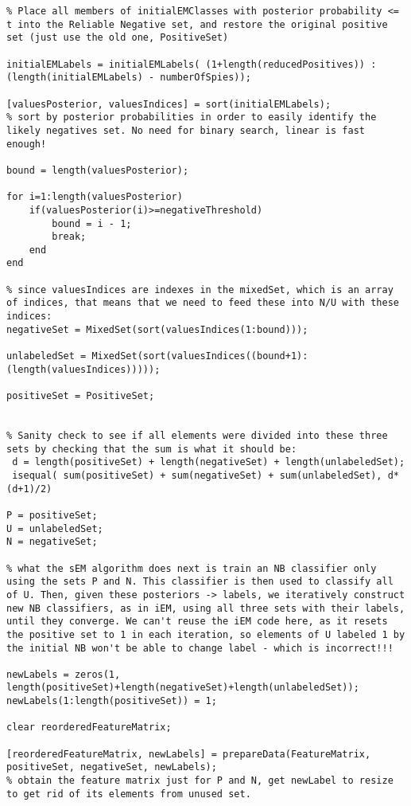 \documentclass[12pt,twoside,notitlepage,amsart]{report} %
\begin{document}
\begin{lstlisting}
% Place all members of initialEMClasses with posterior probability <= t into the Reliable Negative set, and restore the original positive set (just use the old one, PositiveSet)

initialEMLabels = initialEMLabels( (1+length(reducedPositives)) : (length(initialEMLabels) - numberOfSpies));

[valuesPosterior, valuesIndices] = sort(initialEMLabels);
% sort by posterior probabilities in order to easily identify the likely negatives set. No need for binary search, linear is fast enough!

bound = length(valuesPosterior);

for i=1:length(valuesPosterior)
    if(valuesPosterior(i)>=negativeThreshold)
        bound = i - 1;
        break;
    end
end

% since valuesIndices are indexes in the mixedSet, which is an array of indices, that means that we need to feed these into N/U with these indices:
negativeSet = MixedSet(sort(valuesIndices(1:bound)));

unlabeledSet = MixedSet(sort(valuesIndices((bound+1):(length(valuesIndices)))));

positiveSet = PositiveSet;


% Sanity check to see if all elements were divided into these three sets by checking that the sum is what it should be:
 d = length(positiveSet) + length(negativeSet) + length(unlabeledSet);
 isequal( sum(positiveSet) + sum(negativeSet) + sum(unlabeledSet), d*(d+1)/2)
 
P = positiveSet;
U = unlabeledSet;
N = negativeSet;

% what the sEM algorithm does next is train an NB classifier only using the sets P and N. This classifier is then used to classify all of U. Then, given these posteriors -> labels, we iteratively construct new NB classifiers, as in iEM, using all three sets with their labels, until they converge. We can't reuse the iEM code here, as it resets the positive set to 1 in each iteration, so elements of U labeled 1 by the initial NB won't be able to change label - which is incorrect!!!

newLabels = zeros(1, length(positiveSet)+length(negativeSet)+length(unlabeledSet));
newLabels(1:length(positiveSet)) = 1;

clear reorderedFeatureMatrix;

[reorderedFeatureMatrix, newLabels] = prepareData(FeatureMatrix, positiveSet, negativeSet, newLabels);
% obtain the feature matrix just for P and N, get newLabel to resize to get rid of its elements from unused set.


\end{lstlisting}
\end{document}
